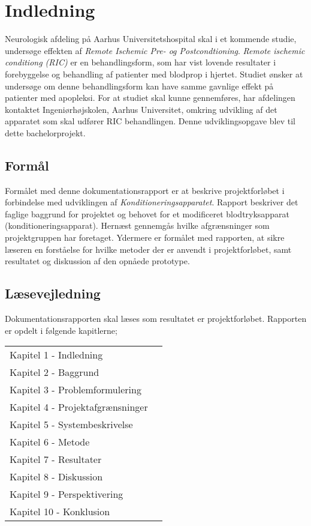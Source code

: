 \chapter{Indledning}
Neurologisk afdeling på Aarhus Universitetshospital skal i et kommende studie, undersøge effekten af \textit{Remote Ischemic Pre- og Postcondtioning}. \textit{Remote ischemic conditiong (RIC)} er en behandlingsform, som har vist lovende resultater i forebyggelse og behandling af patienter med blodprop i hjertet. Studiet ønsker at undersøge om denne behandlingsform kan have samme gavnlige effekt på patienter med apopleksi. For at studiet skal kunne gennemføres, har afdelingen kontaktet Ingeniørhøjskolen, Aarhus Universitet, omkring udvikling af det apparatet som skal udfører RIC behandlingen. Denne udviklingsopgave blev til dette bachelorprojekt. 

\section{Formål}
Formålet med denne dokumentationsrapport er at beskrive projektforløbet i forbindelse med udviklingen af \textit{Konditioneringsapparatet}. Rapport beskriver det faglige baggrund for projektet og behovet for et modificeret blodtryksapparat (konditioneringsapparat). Hernæst gennemgås hvilke afgrænsninger som projektgruppen har foretaget. Ydermere er formålet med rapporten, at sikre læseren en forståelse for hvilke metoder der er anvendt i projektforløbet, samt resultatet og diskussion af den opnåede prototype. 

\section{Læsevejledning}
Dokumentationsrapporten skal læses som resultatet er projektforløbet. Rapporten er opdelt i følgende kapitlerne;

	\begin{longtable}{ p{} p{} } 
		Kapitel 1 - Indledning &   \\
		Kapitel 2 - Baggrund& \\
		Kapitel 3 - Problemformulering& \\
		Kapitel 4 - Projektafgrænsninger& \\
		Kapitel 5 - Systembeskrivelse & \\
		Kapitel 6 - Metode& \\
		Kapitel 7 - Resultater& \\
		Kapitel 8 - Diskussion& \\
		Kapitel 9 - Perspektivering& \\
		Kapitel 10 - Konklusion& \\
	\end{longtable}

